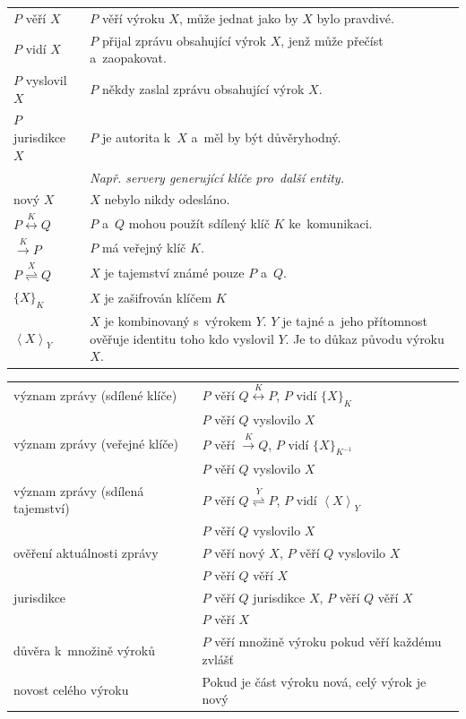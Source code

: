 \begin{tabularx}{\textwidth}{lX}
$P$ věří $X$ & $P$ věří výroku $X$, může jednat jako by $X$ bylo pravdivé. \\
$P$ vidí $X$ & $P$ přijal zprávu obsahující výrok $X$, jenž může přečíst a~zaopakovat. \\
$P$ vyslovil $X$ & $P$ někdy zaslal zprávu obsahující výrok $X$. \\
$P$ jurisdikce $X$ & $P$ je autorita k~$X$ a~měl by být důvěryhodný. \\
& \emph{Např. servery generující klíče pro~další entity.} \\
nový $X$ & $X$ nebylo nikdy odesláno. \\
$P \stackrel{K}{\leftrightarrow} Q$ & $P$ a~$Q$ mohou použít sdílený klíč $K$ ke~komunikaci. \\
$\stackrel{K}{\rightarrow} P$ & $P$ má veřejný klíč $K$. \\
$P \stackrel{X}{\rightleftharpoons} Q$ & $X$ je tajemství známé pouze $P$ a~$Q$. \\
$\{X\}_K$ & $X$ je zašifrován klíčem $K$ \\
$\left<X\right>_Y$ & $X$ je kombinovaný s~výrokem $Y$. $Y$ je tajné a~jeho přítomnost ověřuje identitu toho kdo vyslovil $Y$. Je to důkaz původu výroku $X$. \\
\end{tabularx}

\begin{tabular}{ll}
význam zprávy (sdílené klíče)
& $P$ věří $Q \stackrel{K}{\leftrightarrow} P$, $P$ vidí $\{X\}_K$ \\
& $P$ věří $Q$ vyslovilo $X$ \\
význam zprávy (veřejné klíče) & $P$ věří $\stackrel{K}{\rightarrow} Q$, $P$ vidí $\{X\}_{K^{-1}}$ \\
& $P$ věří $Q$ vyslovilo $X$ \\
význam zprávy (sdílená tajemství) & $P$ věří $Q \stackrel{Y}{\rightleftharpoons} P$, $P$ vidí $\left<X\right>_Y$ \\
& $P$ věří $Q$ vyslovilo $X$ \\

ověření aktuálnosti zprávy
& $P$ věří nový $X$, $P$ věří $Q$ vyslovilo $X$ \\
& $P$ věří $Q$ věří $X$ \\

jurisdikce
& $P$ věří $Q$ jurisdikce $X$, $P$ věří $Q$ věří $X$ \\
& $P$ věří $X$ \\

důvěra k~množině výroků
& $P$ věří množině výroku pokud věří každému zvlášť \\

novost celého výroku
& Pokud je část výroku nová, celý výrok je nový \\
\end{tabular}

